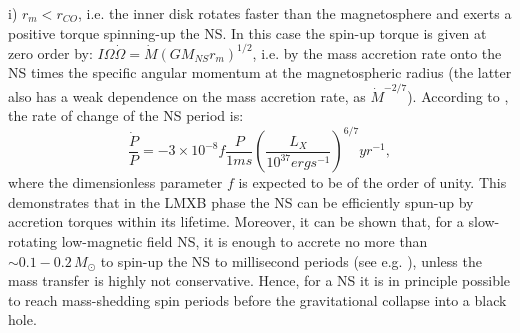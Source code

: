 \documentclass[graybox]{svmult}
\begin{document}
i) $r_m < r_{CO}$, i.e. the inner disk rotates faster than the magnetosphere and exerts a positive torque spinning-up the NS. In this case the spin-up torque is given at zero order by: $I \Omega \dot \Omega = \dot{M} (G M_{NS} r_m)^{1/2}$, i.e. by the mass accretion rate onto the NS times the specific angular momentum at the magnetospheric radius (the latter also has a weak dependence on the mass accretion rate, as $\dot M^{-2/7}$). According to \cite{Ghosh1979}, the rate of change of the NS period is:
\begin{equation}
\frac{\dot P}{P} = -3 \times 10^{-8} f \frac{P} {1 ms} \left(\frac{L_X}{10^{37} erg s^{-1}}\right)^{6/7} yr^{-1},
\end{equation}
where the dimensionless parameter $f$ is expected to be of the order of unity. This demonstrates that in the LMXB phase the NS can be efficiently spun-up by accretion torques within its lifetime. Moreover, it can be shown that, for a slow-rotating low-magnetic field NS, it is enough to accrete no more than $\sim 0.1-0.2\, M_\odot$ to spin-up the NS to millisecond periods (see e.g. \cite{Burderi1999}), unless the mass transfer is highly not conservative. Hence, for a NS it is in principle possible to reach mass-shedding spin periods before the gravitational collapse into a black hole.
\end{document}
